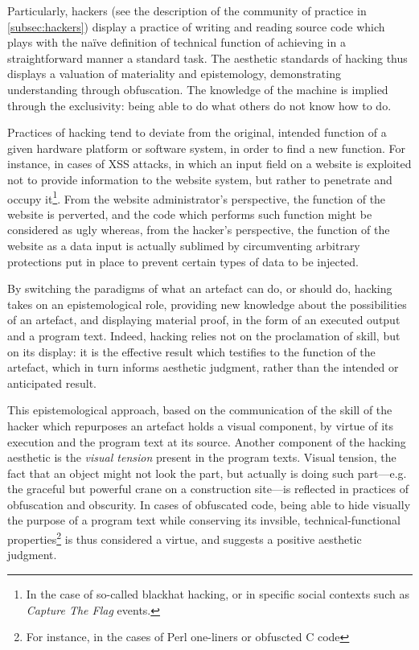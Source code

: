 Particularly, hackers (see the description of the community of practice in \ref{subsec:hackers}) display a practice of writing and reading source code which plays with the naïve definition of technical function of achieving in a straightforward manner a standard task. The aesthetic standards of hacking thus displays a valuation of materiality and epistemology, demonstrating understanding through obfuscation. The knowledge of the machine is implied through the exclusivity: being able to do what others do not know how to do.

Practices of hacking tend to deviate from the original, intended function of a given hardware platform or software system, in order to find a new function. For instance, in cases of XSS attacks, in which an input field on a website is exploited not to provide information to the website system, but rather to penetrate and occupy it\footnote{In the case of so-called blackhat hacking, or in specific social contexts such as \emph{Capture The Flag} events.}. From the website administrator's perspective, the function of the website is perverted, and the code which performs such function might be considered as ugly whereas, from the hacker's perspective, the function of the website as a data input is actually sublimed by circumventing arbitrary protections put in place to prevent certain types of data to be injected.

By switching the paradigms of what an artefact can do, or should do, hacking takes on an epistemological role, providing new knowledge about the possibilities of an artefact, and displaying material proof, in the form of an executed output and a program text. Indeed, hacking relies not on the proclamation of skill, but on its display: it is the effective result which testifies to the function of the artefact, which in turn informs aesthetic judgment, rather than the intended or anticipated result.

This epistemological approach, based on the communication of the skill of the hacker which repurposes an artefact holds a visual component, by virtue of its execution and the program text at its source. Another component of the hacking aesthetic is the \emph{visual tension} present in the program texts. Visual tension, the fact that an object might not look the part, but actually is doing such part—e.g. the graceful but powerful crane on a construction site—is reflected in practices of obfuscation and obscurity. In cases of obfuscated code, being able to hide visually the purpose of a program text while conserving its invsible, technical-functional properties\footnote{For instance, in the cases of Perl one-liners or obfuscted C code} is thus considered a virtue, and suggests a positive aesthetic judgment. 

